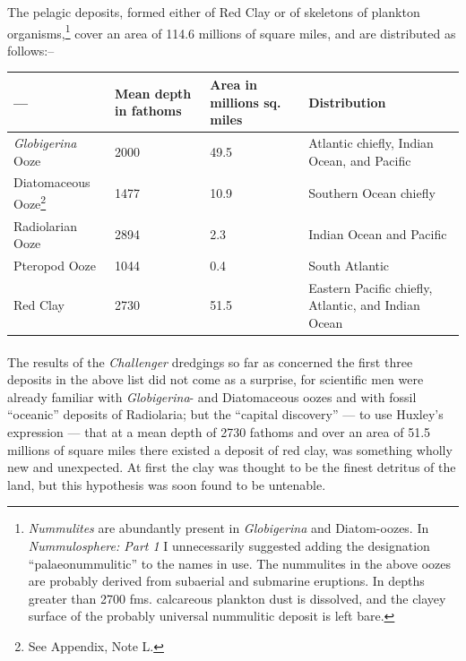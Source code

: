 \documentclass[a4paper, 12pt, oneside, landscape]{article}
\begin{document}
The pelagic deposits, formed either of Red Clay or of skeletons of plankton organisms,\footnote{\emph{Nummulites} are abundantly present in \emph{Globigerina} and Diatom-oozes. In \emph{Nummulosphere: Part 1} I unnecessarily suggested adding the designation ``palaeonummulitic'' to the names in use. The nummulites in the above oozes are probably derived from subaerial and submarine eruptions. In depths greater than 2700 fms. calcareous plankton dust is dissolved, and the clayey surface of the probably universal nummulitic deposit is left bare.} cover an area of 114.6 millions of square miles, and are distributed as follows:--
\begin{center}
\begin{tabular}{ |m{9em}|m{4em}|m{4em}|m{12em}| }
 \hline
 --- & Mean depth in fathoms & Area in millions sq. miles & Distribution \\
 \hline
 \emph{Globigerina}\index{Globigerina} Ooze & 2000 & 49.5 & Atlantic\index{Atlantic} chiefly, Indian Ocean, and Pacific \\
 \hline
 Diatomaceous Ooze\footnote{See Appendix, Note L.} & 1477 & 10.9 & Southern Ocean chiefly \\
 \hline
 Radiolarian Ooze & 2894 & 2.3 & Indian Ocean and Pacific \\
 \hline
 Pteropod Ooze & 1044 & 0.4 & South Atlantic\index{Atlantic} \\
 \hline
 Red Clay\index{red clay} & 2730 & 51.5 & Eastern Pacific chiefly, Atlantic\index{Atlantic}, and Indian Ocean \\
 \hline
\end{tabular}
\end{center}
\paragraph{}
The results of the \emph{Challenger} dredgings so far as concerned the first three deposits in the above list did not come as a surprise, for scientific men were already familiar with \emph{Globigerina}- and Diatomaceous oozes and with fossil ``oceanic'' deposits of Radiolaria; but the ``capital discovery'' --- to use Huxley's expression --- that at a mean depth of 2730 fathoms and over an area of 51.5 millions of square miles there existed a deposit of red clay, was something wholly new and unexpected. At first the clay was thought to be the finest detritus of the land, but this hypothesis was soon found to be untenable.
\end{document}
